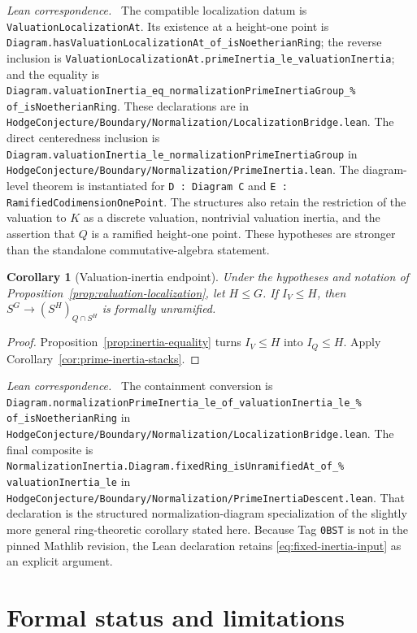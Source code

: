 \documentclass[11pt]{article}
\newtheorem{corollary}[theorem]{Corollary}
\theoremstyle{remark}
\newcommand{\leanpath}[1]{\texttt{\nolinkurl{#1}}}
\newcommand{\leansrc}[1]{%
  \leanpath{HodgeConjecture/Boundary/Normalization/#1}}
\newenvironment{leanfiles}
  {\par\medskip\begingroup\footnotesize\raggedright\noindent
   \textit{Lean correspondence.}\ }
  {\par\endgroup\medskip}
\begin{document}
\begin{leanfiles}
The compatible localization datum is
\leanpath{ValuationLocalizationAt}.  Its existence at a height-one point
is \leanpath{Diagram.hasValuationLocalizationAt_of_isNoetherianRing}; the
reverse inclusion is
\leanpath{ValuationLocalizationAt.primeInertia_le_valuationInertia}; and
the equality is
\leanpath{Diagram.valuationInertia_eq_normalizationPrimeInertiaGroup_%
of_isNoetherianRing}.
These declarations are in \leansrc{LocalizationBridge.lean}.
The direct centeredness inclusion is
\leanpath{Diagram.valuationInertia_le_normalizationPrimeInertiaGroup} in
\leansrc{PrimeInertia.lean}.  The diagram-level theorem is instantiated for
\leanpath{D : Diagram C} and
\leanpath{E : RamifiedCodimensionOnePoint}.  The structures also retain the
restriction of the valuation to \(K\) as a discrete valuation, nontrivial
valuation inertia, and the assertion that \(Q\) is a ramified height-one
point.  These hypotheses are stronger than the standalone
commutative-algebra statement.
\end{leanfiles}

\begin{corollary}[Valuation-inertia endpoint]
\label{cor:valuation-endpoint}
Under the hypotheses and notation of
Proposition~\ref{prop:valuation-localization}, let \(H\leq G\).  If
\(I_V\leq H\), then
\(S^G\longrightarrow(S^H)_{Q\cap S^H}\) is formally unramified.
\end{corollary}

\begin{proof}
Proposition~\ref{prop:inertia-equality} turns \(I_V\leq H\) into
\(I_Q\leq H\).  Apply Corollary~\ref{cor:prime-inertia-stacks}.
\end{proof}

\begin{leanfiles}
The containment conversion is
\leanpath{Diagram.normalizationPrimeInertia_le_of_valuationInertia_le_%
of_isNoetherianRing}
in \leansrc{LocalizationBridge.lean}.  The final composite is
\leanpath{NormalizationInertia.Diagram.fixedRing_isUnramifiedAt_of_%
valuationInertia_le}
in \leansrc{PrimeInertiaDescent.lean}.  That declaration is the structured
normalization-diagram specialization of the slightly more general
ring-theoretic corollary stated here.  Because Tag \texttt{0BST} is not in
the pinned Mathlib revision, the Lean declaration retains
\eqref{eq:fixed-inertia-input} as an explicit argument.
\end{leanfiles}

\section{Formal status and limitations}
\label{sec:status}
\end{document}
